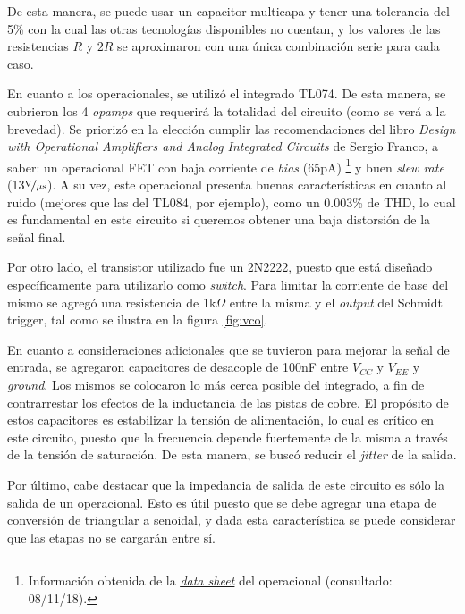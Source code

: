 \documentclass[../../tc_tp6_main.tex]{subfiles}
\begin{document}
De esta manera, se puede usar un capacitor multicapa y tener una tolerancia del 5\% con la cual las otras tecnolog\'ias disponibles no cuentan, y los valores de las resistencias $R$ y $2R$ se aproximaron con una \'unica combinaci\'on serie para cada caso.\par

En cuanto a los operacionales, se utiliz\'o el integrado TL074. De esta manera, se cubrieron los 4 \textit{opamps} que requerir\'a la totalidad del circuito (como se ver\'a a la brevedad). Se prioriz\'o en la elecci\'on cumplir las recomendaciones del libro \textit{Design with Operational Amplifiers and Analog Integrated Circuits} de Sergio Franco, a saber: un operacional FET con baja corriente de \textit{bias} (65pA) \footnote{Informaci\'on obtenida de la \href{http://www.ti.com/lit/ds/symlink/tl074.pdf}{\underline{\textit{data sheet}}} del operacional (consultado: 08/11/18).} y buen \textit{slew rate} (13$\nicefrac{\mathrm{V}}{\mu\mathrm{s}}$). A su vez, este operacional presenta buenas caracter\'isticas en cuanto al ruido (mejores que las del TL084, por ejemplo), como un 0.003\% de THD, lo cual es fundamental en este circuito si queremos obtener una baja distorsi\'on de la se\~nal final.\par 

Por otro lado, el transistor utilizado fue un 2N2222, puesto que est\'a dise\~nado espec\'ificamente para utilizarlo como \textit{switch}. Para limitar la corriente de base del mismo se agreg\'o una resistencia de 1k$\Omega$ entre la misma y el \textit{output} del Schmidt trigger, tal como se ilustra en la figura \ref{fig:vco}. \par

En cuanto a consideraciones adicionales que se tuvieron para mejorar la se\~nal de entrada, se agregaron capacitores de desacople de 100nF entre $V_{CC}$ y $V_{EE}$ y \textit{ground}. Los mismos se colocaron lo m\'as cerca posible del integrado, a fin de contrarrestar los efectos de la inductancia de las pistas de cobre. El prop\'osito de estos capacitores es estabilizar la tensi\'on de alimentaci\'on, lo cual es cr\'itico en este circuito, puesto que la frecuencia depende fuertemente de la misma a trav\'es de la tensi\'on de saturaci\'on. De esta manera, se busc\'o reducir el \textit{jitter} de la salida.\par

Por \'ultimo, cabe destacar que la impedancia de salida de este circuito es s\'olo la salida de un operacional. Esto es \'util puesto que se debe agregar una etapa de conversi\'on de triangular a senoidal, y dada esta caracter\'istica se puede considerar que las etapas no se cargar\'an entre s\'i. 
\end{document}
